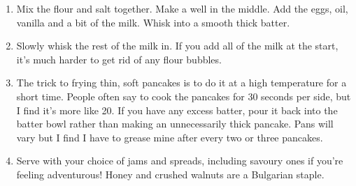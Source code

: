 \documentclass[main.tex]{subfiles}
\begin{document}
\begin{enumerate}
    \item Mix the flour and salt together. Make a well in the middle. Add the eggs, oil, vanilla and a bit of the milk. Whisk into a smooth thick batter. 
    \item Slowly whisk the rest of the milk in. If you add all of the milk at the start, it’s much harder to get rid of any flour bubbles.
    \item The trick to frying thin, soft pancakes is to do it at a high temperature for a short time. People often say to cook the pancakes for 30 seconds per side, but I find it’s more like 20. If you have any excess batter, pour it back into the batter bowl rather than making an unnecessarily thick pancake. Pans will vary but I find I have to grease mine after every two or three pancakes.
    \item Serve with your choice of jams and spreads, including savoury ones if you're feeling adventurous! Honey and crushed walnuts are a Bulgarian staple.
	
\end{enumerate}

\end{document}

